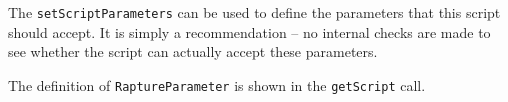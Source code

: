 The \verb+setScriptParameters+ can be used to define the parameters that this script should accept. It
is simply a recommendation -- no internal checks are made to see whether the script can actually accept these
parameters.

The definition of \verb+RaptureParameter+ is shown in the \verb+getScript+ call.
